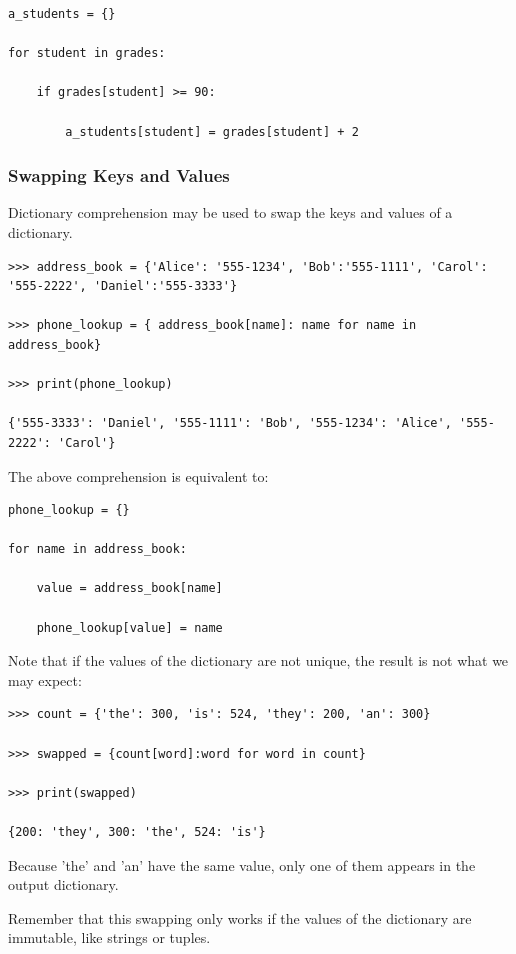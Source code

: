 \documentclass{article}
\begin{document}
\begin{lstlisting}
a_students = {} 

for student in grades: 

    if grades[student] >= 90: 

        a_students[student] = grades[student] + 2
\end{lstlisting}

\subsubsection{Swapping Keys and Values}

Dictionary comprehension may be used to swap the keys and values of a dictionary. 

\begin{lstlisting}
>>> address_book = {'Alice': '555-1234', 'Bob':'555-1111', 'Carol': '555-2222', 'Daniel':'555-3333'} 

>>> phone_lookup = { address_book[name]: name for name in address_book}

>>> print(phone_lookup) 

{'555-3333': 'Daniel', '555-1111': 'Bob', '555-1234': 'Alice', '555-2222': 'Carol'}
\end{lstlisting}

The above comprehension is equivalent to: 

\begin{lstlisting}
phone_lookup = {} 

for name in address_book: 

    value = address_book[name]

    phone_lookup[value] = name  
\end{lstlisting}

Note that if the values of the dictionary are not unique, the result is not what we may expect: 

\begin{lstlisting}
>>> count = {'the': 300, 'is': 524, 'they': 200, 'an': 300} 

>>> swapped = {count[word]:word for word in count}  

>>> print(swapped)

{200: 'they', 300: 'the', 524: 'is'}
\end{lstlisting}

Because  'the' and 'an' have the same value, only one of them appears in the output dictionary.

Remember that this swapping only works if the values of the dictionary are immutable, like strings or tuples. 
\end{document}
